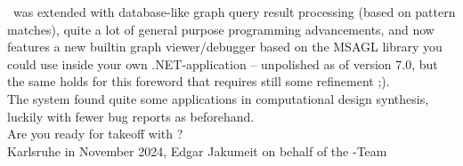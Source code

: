 \GrG\ was extended with database-like graph query result processing (based on pattern matches), quite a lot of general purpose programming advancements, and now features a new builtin graph viewer/debugger based on the MSAGL library\cite{MSAGL} you could use inside your own .NET-application -- unpolished as of version 7.0, but the same holds for this foreword that requires still some refinement ;).\\[2ex]

The system found quite some applications in computational design synthesis, luckily with fewer bug reports as beforehand.\\[2ex]

Are you ready for takeoff with \GrG?\\[2ex]

\noindent Karlsruhe in November 2024, Edgar Jakumeit on behalf of the \GrG-Team
